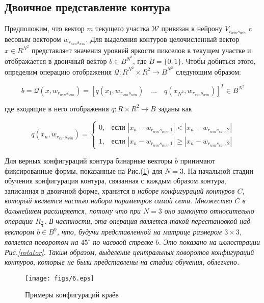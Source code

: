 \documentclass[a4paper,12pt]{report}
\begin{document}
\subsection{Двоичное представление контура}
 
Предположим, что вектор $m$ текущего участка $\mathcal{W}$ привязан к нейрону $V_{r_{win} s_{win}}$ c весовым вектором $w_{r_{win} s_{win}}$. Для выделения контуров целочисленный вектор $x\in R^{N^2}$ представляeт значения уровней яркости пикселов в текущем участке и отображается в двоичный вектор $b\in B^{N^2}$, где $B=\{0,1\}$. Чтобы добиться этого, определим операцию отображения $\mathcal{Q}\colon R^{N^2}\times R^2\to B^{N^2}$ следующим образом:

\begin{equation}
b=\mathcal{Q}(x,w_{r_{win} s_{win}})=[q(x_1,w_{r_{win} s_{win}})\quad\dots\quad q(x_{N^2},w_{r_{win} s_{win}})]^T\in B^{N^2}
\end{equation}

где входящие в него отображения $q\colon R\times R^2\to B$ заданы как

\begin{equation}
q(x_n,w_{r_{win} s_{win}}) = \left\{ 
\begin{array}{cl}
0, & \mbox{если $|x_n-w_{r_{win} s_{win},1}| < |x_n-w_{r_{win} s_{win},2}|$} \\
1,& \mbox{если $|x_n-w_{r_{win} s_{win},1}|\geq |x_n-w_{r_{win} s_{win},2}|$}
\end{array} \right.
\label{qmapping}
\end{equation}
 
Для верных конфигураций контура бинарные векторы $b$ принимают фиксированные формы, показанные на Рис.(\ref{validedges}) для $N=3$. На начальной стадии обучения конфигурация контура, связанная с каждым образом контура, записанная в двоичной форме, хранится в \itshape наборе конфигураций контуров \normalfont $C$, который является частью набора параметров самой сети. Множество $C$ в дальнейшем расширяется, потому что при $N=3$ оно замкнуто относительно операции $ R_{\frac{\pi}{4}}$. В частности, эта операция является такой перестановкой над вектором $b\in B^9$, что, будучи представленной на матрице размером $3\times 3$, является поворотом на $45^{\circ}$ по часовой стрелке $b$. Это показано на иллюстрации Рис.\ref{rotator}. Таким образом, выделение центральных поворотов конфигураций контуров, которые не были представлены на стадии обучения, облегчено.

\begin{center}
\begin{figure}[!t]
\begin{center}
\texttt{[image: figs/6.eps]}
\end{center}\caption{Примеры конфигураций краёв}
\label{validedges}
\end{figure}
\end{center}
\end{document}
